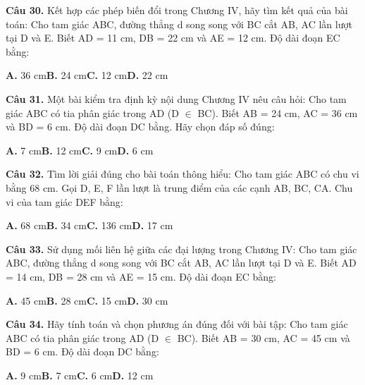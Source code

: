 \documentclass[11pt,a4paper]{article}
\begin{document}
\textbf{\color{primary} Câu 30.} Kết hợp các phép biến đổi trong Chương IV, hãy tìm kết quả của bài toán: Cho tam giác ABC, đường thẳng d song song với BC cắt AB, AC lần lượt tại D và E. Biết AD = 11 cm, DB = 22 cm và AE = 12 cm. Độ dài đoạn EC bằng:\par
\hspace*{1.5em}\textbf{A.} 36 cm\quad\quad \textbf{B.} 24 cm\quad\quad \textbf{C.} 12 cm\quad\quad \textbf{D.} 22 cm\par\vspace{2pt}
\textbf{\color{primary} Câu 31.} Một bài kiểm tra định kỳ nội dung Chương IV nêu câu hỏi: Cho tam giác ABC có tia phân giác trong AD (D $\in$ BC). Biết AB = 24 cm, AC = 36 cm và BD = 6 cm. Độ dài đoạn DC bằng. Hãy chọn đáp số đúng:\par
\hspace*{1.5em}\textbf{A.} 7 cm\quad\quad \textbf{B.} 12 cm\quad\quad \textbf{C.} 9 cm\quad\quad \textbf{D.} 6 cm\par\vspace{2pt}
\textbf{\color{primary} Câu 32.} Tìm lời giải đúng cho bài toán thông hiểu: Cho tam giác ABC có chu vi bằng 68 cm. Gọi D, E, F lần lượt là trung điểm của các cạnh AB, BC, CA. Chu vi của tam giác DEF bằng:\par
\hspace*{1.5em}\textbf{A.} 68 cm\quad\quad \textbf{B.} 34 cm\quad\quad \textbf{C.} 136 cm\quad\quad \textbf{D.} 17 cm\par\vspace{2pt}
\textbf{\color{primary} Câu 33.} Sử dụng mối liên hệ giữa các đại lượng trong Chương IV: Cho tam giác ABC, đường thẳng d song song với BC cắt AB, AC lần lượt tại D và E. Biết AD = 14 cm, DB = 28 cm và AE = 15 cm. Độ dài đoạn EC bằng:\par
\hspace*{1.5em}\textbf{A.} 45 cm\quad\quad \textbf{B.} 28 cm\quad\quad \textbf{C.} 15 cm\quad\quad \textbf{D.} 30 cm\par\vspace{2pt}
\textbf{\color{primary} Câu 34.} Hãy tính toán và chọn phương án đúng đối với bài tập: Cho tam giác ABC có tia phân giác trong AD (D $\in$ BC). Biết AB = 30 cm, AC = 45 cm và BD = 6 cm. Độ dài đoạn DC bằng:\par
\hspace*{1.5em}\textbf{A.} 9 cm\quad\quad \textbf{B.} 7 cm\quad\quad \textbf{C.} 6 cm\quad\quad \textbf{D.} 12 cm\par\vspace{2pt}
\end{document}
